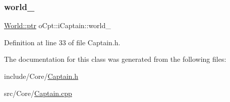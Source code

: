 \hypertarget{classo_cpt_1_1i_captain_a6e08906c347d5fc66605bfde73046194}{}\label{classo_cpt_1_1i_captain_a6e08906c347d5fc66605bfde73046194} 
\subsubsection{\texorpdfstring{world\+\_\+}{world\_}}
{\footnotesize\ttfamily \hyperlink{classo_cpt_1_1_world_aa6e591e3096d5de71e0cec9039663d67}{World\+::ptr} o\+Cpt\+::i\+Captain\+::world\+\_\+\hspace{0.3cm}{\ttfamily [protected]}}



Definition at line 33 of file Captain.\+h.



The documentation for this class was generated from the following files\+:\begin{DoxyCompactItemize}
\item 
include/\+Core/\hyperlink{_captain_8h}{Captain.\+h}\item 
src/\+Core/\hyperlink{_captain_8cpp}{Captain.\+cpp}\end{DoxyCompactItemize}
